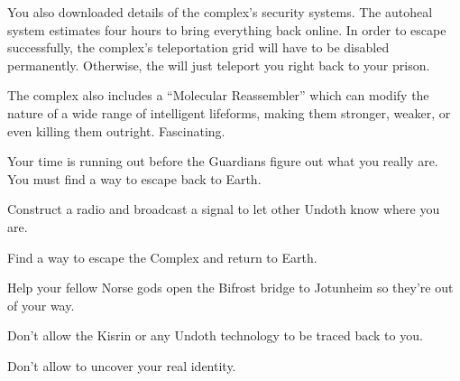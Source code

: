 \documentclass[char]{guardians}
\begin{document}
You also downloaded details of the complex's security systems. The autoheal system estimates four hours to bring everything back online. In order to escape successfully, the complex's teleportation grid will have to be disabled permanently. Otherwise, the \cWarden{} will just teleport you right back to your prison.

The complex also includes a ``Molecular Reassembler'' which can modify the nature of a wide range of intelligent lifeforms, making them stronger, weaker, or even killing them outright. Fascinating.






Your time is running out before the Guardians figure out what you really are. You must find a way to escape back to Earth.



\begin{itemz}[Goals]
  \item Construct a radio and broadcast a signal to let other Undoth know where you are.
  \item Find a way to escape the Complex and return to Earth.
  \item Help your fellow Norse gods open the Bifrost bridge to Jotunheim so they're out of your way.
  \item Don't allow the Kisrin or any Undoth technology to be traced back to you.
  \item Don't allow \cAmaterasu{} to uncover your real identity.
\end{itemz}
\end{document}
